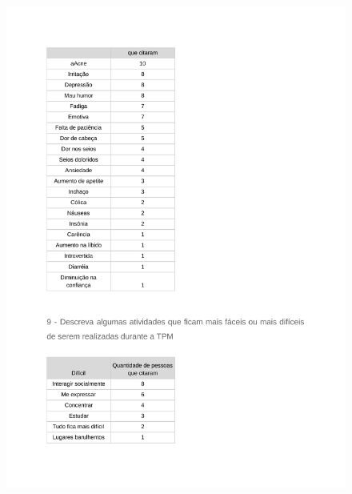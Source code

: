 \begin{apendicesenv}
    \begin{figure}[h]
        \centering
        \includegraphics[keepaspectratio=true,scale=0.7]{figuras/Tab21.pdf}
    \end{figure}
    

\end{apendicesenv}
